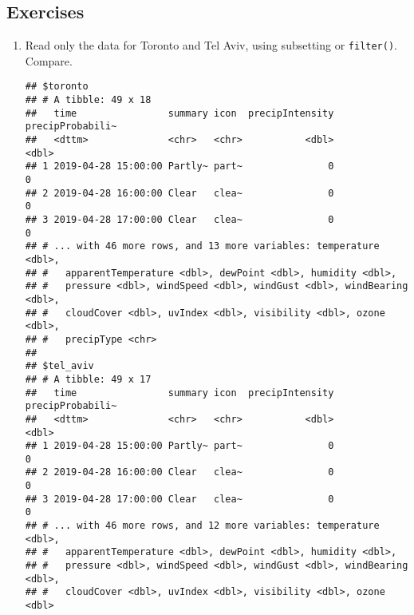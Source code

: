 \documentclass[]{book}
\newenvironment{Shaded}{\begin{snugshade}}{\end{snugshade}}
\newcommand{\KeywordTok}[1]{\textcolor[rgb]{0.13,0.29,0.53}{\textbf{#1}}}
\newcommand{\NormalTok}[1]{#1}
\newcommand{\OperatorTok}[1]{\textcolor[rgb]{0.81,0.36,0.00}{\textbf{#1}}}
\newcommand{\StringTok}[1]{\textcolor[rgb]{0.31,0.60,0.02}{#1}}
\begin{document}
\hypertarget{exercises-10}{%
\subsection{Exercises}\label{exercises-10}}

\begin{enumerate}
\def\labelenumi{\arabic{enumi}.}
\item
  Read only the data for Toronto and Tel Aviv, using subsetting or \texttt{filter()}. Compare.

\begin{Shaded}
\end{Shaded}

\begin{verbatim}
## $toronto
## # A tibble: 49 x 18
##   time                summary icon  precipIntensity precipProbabili~
##   <dttm>              <chr>   <chr>           <dbl>            <dbl>
## 1 2019-04-28 15:00:00 Partly~ part~               0                0
## 2 2019-04-28 16:00:00 Clear   clea~               0                0
## 3 2019-04-28 17:00:00 Clear   clea~               0                0
## # ... with 46 more rows, and 13 more variables: temperature <dbl>,
## #   apparentTemperature <dbl>, dewPoint <dbl>, humidity <dbl>,
## #   pressure <dbl>, windSpeed <dbl>, windGust <dbl>, windBearing <dbl>,
## #   cloudCover <dbl>, uvIndex <dbl>, visibility <dbl>, ozone <dbl>,
## #   precipType <chr>
## 
## $tel_aviv
## # A tibble: 49 x 17
##   time                summary icon  precipIntensity precipProbabili~
##   <dttm>              <chr>   <chr>           <dbl>            <dbl>
## 1 2019-04-28 15:00:00 Partly~ part~               0                0
## 2 2019-04-28 16:00:00 Clear   clea~               0                0
## 3 2019-04-28 17:00:00 Clear   clea~               0                0
## # ... with 46 more rows, and 12 more variables: temperature <dbl>,
## #   apparentTemperature <dbl>, dewPoint <dbl>, humidity <dbl>,
## #   pressure <dbl>, windSpeed <dbl>, windGust <dbl>, windBearing <dbl>,
## #   cloudCover <dbl>, uvIndex <dbl>, visibility <dbl>, ozone <dbl>
\end{verbatim}


\end{enumerate}
\end{document}
